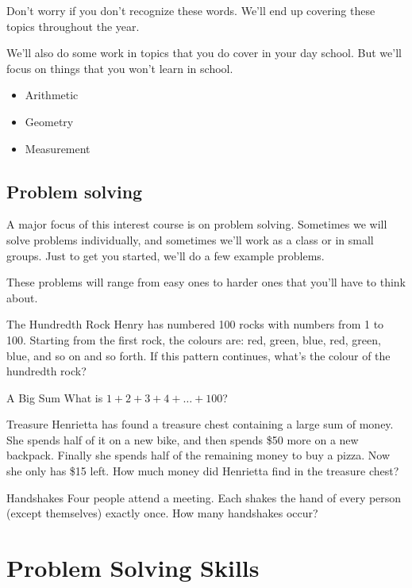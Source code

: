 \documentclass[a4paper,10pt]{report}
\begin{document}
Don't worry if you don't recognize these words. We'll end up covering these
topics throughout the year.

We'll also do some work in topics that you do cover in your day school. But
we'll focus on things that you won't learn in school.

\begin{itemize}
 \item Arithmetic
 \item Geometry
 \item Measurement
\end{itemize}

\section{Problem solving}
A major focus of this interest course is on problem solving. Sometimes we will
solve problems individually, and sometimes we'll work as a class or in small
groups. Just to get you started, we'll do a few example problems.

These problems will range from easy ones to harder ones that you'll have to
think about.

\begin{problem}{The Hundredth Rock}
 Henry has numbered 100 rocks with numbers from 1 to 100. Starting from the
 first rock, the colours are: red, green, blue, red, green, blue, and so on and
 so forth. If this pattern continues, what's the colour of the hundredth rock?
\end{problem}

\begin{problem}{A Big Sum}
 What is $1+2+3+4+\ldots+100$?
\end{problem}

\begin{problem}{Treasure}
 Henrietta has found a treasure chest containing a large sum of money. She
 spends half of it on a new bike, and then spends \$50 more on a new backpack.
 Finally she spends half of the remaining money to buy a pizza. Now she only has
 \$15 left. How much money did Henrietta find in the treasure chest?
\end{problem}

\begin{problem}{Handshakes}
 Four people attend a meeting. Each shakes the hand of every person (except
 themselves) exactly once. How many handshakes occur?
\end{problem}

\chapter{Problem Solving Skills}
\end{document}
